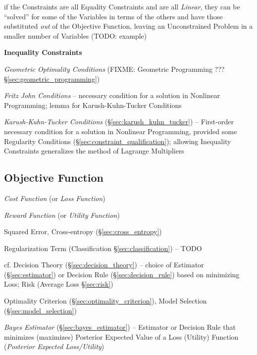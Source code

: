 if the Constraints are all Equality Constraints and are all \emph{Linear}, they
can be ``solved'' for some of the Variables in terms of the others and have
those substituted \emph{out} of the Objective Function, leaving an
Unconstrained Problem in a smaller number of Variables (TODO: example)


\textbf{Inequality Constraints}

\emph{Geometric Optimality Conditions} (FIXME: Geometric Programming ???
\S\ref{sec:geometric_programming})

\emph{Fritz John Conditions} -- necessary condition for a solution in Nonlinear
Programming; lemma for Karush-Kuhn-Tucker Conditions

\emph{Karush-Kuhn-Tucker Conditions} (\S\ref{sec:karush_kuhn_tucker}) --
First-order necessary condition for a solution in Nonlinear Programming,
provided some Regularity Conditions (\S\ref{sec:constraint_qualification});
allowing Inequality Constraints generalizes the method of Lagrange Multipliers



\subsection{Objective Function}\label{sec:objective_function}


\emph{Cost Function} (or \emph{Loss Function})

\emph{Reward Function} (or \emph{Utility Function})

Squared Error, Cross-entropy (\S\ref{sec:cross_entropy})

Regularization Term (Classification \S\ref{sec:classification}) -- TODO

\fist cf. Decision Theory (\S\ref{sec:decision_theory}) -- choice of Estimator
(\S\ref{sec:estimator}) or Decision Rule (\S\ref{sec:decision_rule}) based on
minimizing Loss; Risk (Average Loss \S\ref{sec:risk})

\fist Optimality Criterion (\S\ref{sec:optimality_criterion}), Model Selection
(\S\ref{sec:model_selection})

\fist \emph{Bayes Estimator} (\S\ref{sec:bayes_estimator}) -- Estimator or
Decision Rule that minimizes (maximizes) Posterior Expected Value of a Loss
(Utility) Function (\emph{Posterior Expected Loss/Utility})

